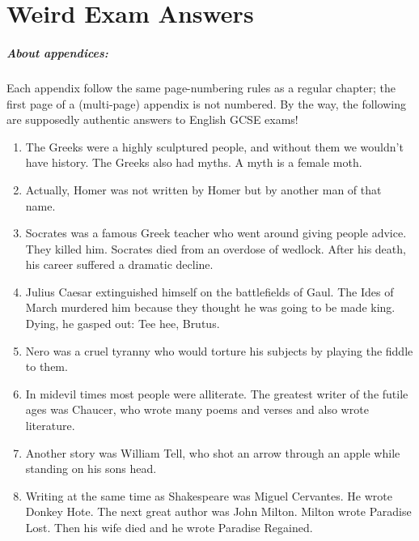 \chapter{Weird Exam Answers}	%

\paragraph{About appendices:}
	Each appendix follow the same page-numbering rules
	as a regular chapter; the first page of a
	(multi-page) appendix is not numbered.
	By the way, the following are supposedly
	authentic answers to English GCSE exams!


\begin{enumerate}

\item
The Greeks were a highly sculptured people, and without
them we wouldn't have history. The Greeks also had myths.
A myth is a female moth.

\item
Actually, Homer was not written by Homer but by another
man of that name.

\item
Socrates was a famous Greek teacher who went around
giving people advice. They killed him. Socrates died from an
overdose of wedlock. After his death, his career suffered a
dramatic decline.

\item
Julius Caesar extinguished himself on the battlefields
of Gaul. The Ides of March murdered him because they thought
he was going to be made king. Dying, he gasped out: Tee hee,
Brutus.

\item
Nero was a cruel tyranny who would torture his subjects
by playing the fiddle to them.

\item
In midevil times most people were alliterate. The
greatest writer of the futile ages was Chaucer, who
wrote many poems and verses and also wrote literature.

\item
Another story was William Tell, who shot an arrow
through an apple while standing on his sons head.

\item
Writing at the same time as Shakespeare was Miguel
Cervantes. He wrote Donkey Hote. The next great author
was John Milton. Milton wrote Paradise Lost. Then his
wife died and he wrote Paradise Regained.


\end{enumerate}

